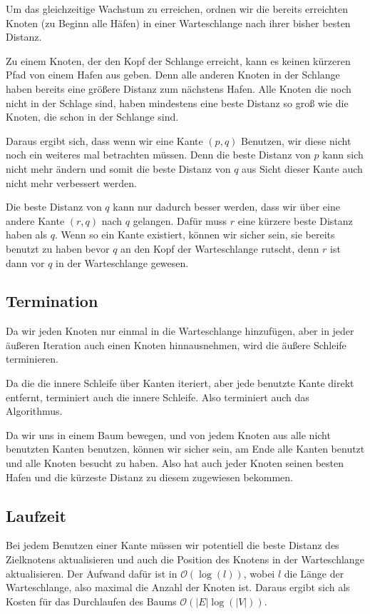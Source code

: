 \documentclass[parskip=half,a4paper]{scrartcl}
\begin{document}
Um das gleichzeitige Wachstum zu erreichen, ordnen wir die bereits erreichten Knoten (zu Beginn alle Häfen) in einer Warteschlange nach ihrer bisher besten Distanz.

Zu einem Knoten, der den Kopf der Schlange erreicht, kann es keinen kürzeren Pfad von einem Hafen aus geben. Denn alle anderen Knoten in der Schlange haben bereits eine grö{\ss}ere Distanz zum nächstens Hafen. Alle Knoten die noch nicht in der Schlage sind, haben mindestens eine beste Distanz so gro{\ss} wie die Knoten, die schon in der Schlange sind.

Daraus ergibt sich, dass wenn wir eine Kante $(p,q)$ Benutzen, wir diese nicht noch ein weiteres mal betrachten müssen. Denn die beste Distanz von $p$ kann sich nicht mehr ändern und somit die beste Distanz von $q$ aus Sicht dieser Kante auch nicht mehr verbessert werden.

Die beste Distanz von $q$ kann nur dadurch besser werden, dass wir über eine andere Kante $(r,q)$ nach $q$ gelangen. Dafür muss $r$ eine kürzere beste Distanz haben als $q$. Wenn so ein Kante existiert, können wir sicher sein, sie bereits benutzt zu haben bevor $q$ an den Kopf der Warteschlange rutscht, denn $r$ ist dann vor $q$ in der Warteschlange gewesen.

\subsection*{Termination}

Da wir jeden Knoten nur einmal in die Warteschlange hinzufügen, aber in jeder äußeren Iteration auch einen Knoten hinnausnehmen, wird die äußere Schleife terminieren.

Da die die innere Schleife über Kanten iteriert, aber jede benutzte Kante direkt entfernt, terminiert auch die innere Schleife. Also terminiert auch das Algorithmus.

Da wir uns in einem Baum bewegen, und von jedem Knoten aus alle nicht benutzten Kanten benutzen, können wir sicher sein, am Ende alle Kanten benutzt und alle Knoten besucht zu haben. Also hat auch jeder Knoten seinen besten Hafen und die kürzeste Distanz zu diesem zugewiesen bekommen.

\subsection*{Laufzeit}

Bei jedem Benutzen einer Kante müssen wir potentiell die beste Distanz des Zielknotens aktualisieren und auch die Position des Knotens in der Warteschlange aktualisieren. Der Aufwand dafür ist in \(\mathcal{O}(\log(l))\), wobei $l$ die Länge der Warteschlange, also maximal die Anzahl der Knoten ist. Daraus ergibt sich als Kosten für das Durchlaufen des Baums \(\mathcal{O}(|E|\log(|V|))\).
\end{document}
